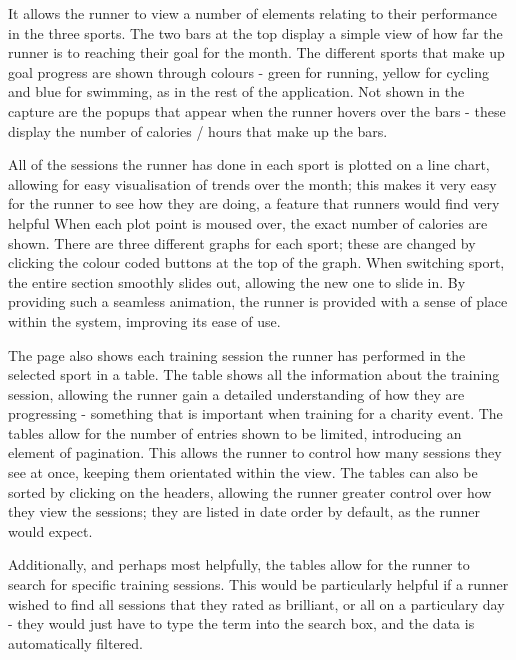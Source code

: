 \documentclass{article}[12pt,a4paper]
\begin{document}
It allows the runner to view a number of elements relating to their performance in the three sports. The two bars at the top display a simple view of how far the runner is to reaching their goal for the month. The different sports that make up goal progress are shown through colours - green for running, yellow for cycling and blue for swimming, as in the rest of the application. Not shown in the capture are the popups that appear when the runner hovers over the bars - these display the number of calories / hours that make up the bars. 

All of the sessions the runner has done in each sport is plotted on a line chart, allowing for easy visualisation of trends over the month; this makes it very easy for the runner to see how they are doing, a feature that runners would find very helpful When each plot point is moused over, the exact number of calories are shown. There are three different graphs for each sport; these are changed by clicking the colour coded buttons at the top of the graph. When switching sport, the entire section smoothly slides out, allowing the new one to slide in. By providing such a seamless animation, the runner is provided with a sense of place within the system, improving its ease of use.

The page also shows each training session the runner has performed in the selected sport in a table. The table shows all the information about the training session, allowing the runner gain a detailed understanding of how they are progressing - something that is important when training for a charity event. The tables allow for the number of entries shown to be limited, introducing an element of pagination. This allows the runner to control how many sessions they see at once, keeping them orientated within the view. The tables can also be sorted by clicking on the headers, allowing the runner greater control over how they view the sessions; they are listed in date order by default, as the runner would expect.

Additionally, and perhaps most helpfully, the tables allow for the runner to search for specific training sessions. This would be particularly helpful if a runner wished to find all sessions that they rated as brilliant, or all on a particulary day - they would just have to type the term into the search box, and the data is automatically filtered.

\clearpage
\end{document}
